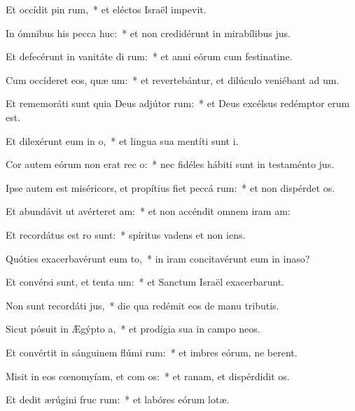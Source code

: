 \item Et occídit pin rum,~* et eléctos Israël impevit.
\item In ómnibus his pecca huc:~* et non credidérunt in mirabílibus jus.
\item Et defecérunt in vanitáte di rum:~* et anni eórum cum festinatine.
\item Cum occíderet eos, quæ um:~* et revertebántur, et dilúculo veniébant ad um.
\item Et rememoráti sunt quia Deus adjútor  rum:~* et Deus excélsus redémptor erum est.
\item Et dilexérunt eum in  o,~* et lingua sua mentíti sunt i.
\item Cor autem eórum non erat rec  o:~* nec fidéles hábiti sunt in testaménto jus.
\item Ipse autem est miséricors, et propítius fiet peccá rum:~* et non dispérdet os.
\item Et abundávit ut avérteret  am:~* et non accéndit omnem iram am:
\item Et recordátus est  ro sunt:~* spíritus vadens et non iens.
\item Quóties exacerbavérunt eum  to,~* in iram concitavérunt eum in inaso?
\item Et convérsi sunt, et tenta um:~* et Sanctum Israël exacerbarunt.
\item Non sunt recordáti  jus,~* die qua redémit eos de manu tributis.
\item Sicut pósuit in Ægýpto  a,~* et prodígia sua in campo neos.
\item Et convértit in sánguinem flúmi rum:~* et imbres eórum, ne berent.
\item Misit in eos cœnomyíam, et com os:~* et ranam, et dispérdidit os.
\item Et dedit ærúgini fruc rum:~* et labóres eórum lotæ.
